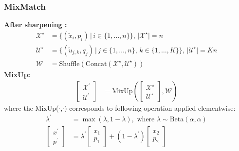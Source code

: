 \documentclass[11pt]{beamer}
\begin{document}
\begin{frame}
    \frametitle{MixMatch}
    \textbf{After sharpening :}
    \begin{align*}
        \mathcal{X}^\star &= \{ (\tilde{x}_i,p_i)\,|\, i \in \{1,\dots,n\}  \}, \, |\mathcal{X}^\star| = n \\
        \mathcal{U}^\star &= \{ (\tilde{u}_{j,k},q_j)\,|\, j \in \{1,\dots,n\},\,k \in \{1,\dots,K\}  \}, \, |\mathcal{U}^\star| = Kn\\
        \mathcal{W} &= \text{Shuffle}(\text{Concat}(\mathcal{X}^\star,\mathcal{U}^\star))
    \end{align*}
    \textbf{MixUp:}
    \begin{align*}
        \begin{bmatrix} \mathcal{X}^\prime \\ \mathcal{U}^\prime \end{bmatrix} &= \text{MixUp}(\begin{bmatrix} \mathcal{X}^\star \\ \mathcal{U}^\star \end{bmatrix},\mathcal{W}) 
    \end{align*}
    where the MixUp($\cdot$,$\cdot$) corresponds to following operation applied elementwise:
    \begin{align*}
        \lambda^\prime &= \max(\lambda,1-\lambda), \text{ where } \lambda \sim \text{Beta}(\alpha,\alpha) \\
        \begin{bmatrix}x^\prime \\ p^\prime\end{bmatrix} &= \lambda^\prime \begin{bmatrix}
            x_1 \\ p_1
        \end{bmatrix} + (1-\lambda^\prime) \begin{bmatrix}
            x_2 \\ p_2
        \end{bmatrix} \\
    \end{align*}
\end{frame}
\end{document}
